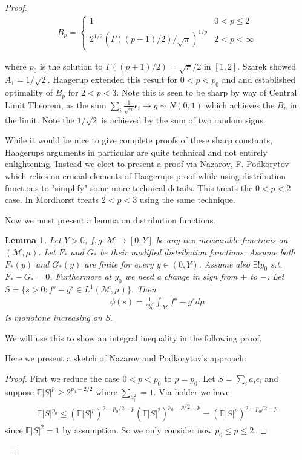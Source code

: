 \documentclass[10pt]{article}
\newcommand{\E}{\mathbb{E}}
\newcommand{\1}{\textbf{1}}
\newtheorem{lemma}[theorem]{Lemma}
\theoremstyle{remark}
\theoremstyle{definition}
\begin{document}
\begin{proof}
\begin{align*}
	B_p = 
	\begin{cases}
		1 & 0 < p \leq 2\\
		2^{1/2}(\Gamma((p+1)/2)/\sqrt{\pi})^{1/p} & 2 < p < \infty
	\end{cases}
\end{align*}

where $p_0$ is the solution to $\Gamma((p+1)/2) = \sqrt{\pi}/2$ in $[1,2]$. Szarek \cite{S} showed $A_1 = 1/\sqrt{2}$. Haagerup extended this result for $0 < p < p_0$ and and established optimality of $B_p$ for $2 < p <3$. Note this is seen to be sharp by way of Central Limit Theorem, as the sum $\sum_i \frac{1}{\sqrt{n}}\epsilon_i \to g \sim N(0,1)$ which achieves the $B_p$ in the limit. Note the $1/\sqrt{2}$ is achieved by the sum of two random signs.

While it would be nice to give complete proofs of these sharp constants, Haagerups arguments in particular are quite technical and not entirely enlightening. Instead we elect to present a proof via Nazarov, F. Podkorytov \cite{NP} which relies on crucial elements of Haagerups proof while using distribution functions to "simplify" some more technical details. This treats the $0 < p <2$ case. In \cite{M} Mordhorst treats $2 < p < 3$ using the same technique.

Now we must present a lemma on distribution functions.

\begin{lemma}
	Let $Y > 0$, $f,g : \mathcal{M} \to [0,Y]$ be any two measurable functions on $(\mathcal{M},\mu)$. Let $F_*$ and $G_*$ be their modified distribution functions. Assume both $F_*(y)$ and $G_*(y)$ are finite for every $y \in (0,Y)$. Assume also $\exists ! y_0$ s.t. $F_*-G_* = 0$. Furthermore at $y_0$ we need a change in sign from $+$ to $-$. Let $S = \{s > 0: f^s - g^s \in L^1(\mathcal{M},\mu)\}$. Then
	\begin{align*}
		\phi(s) = \frac{1}{sy_0^s}\int_{\mathcal{M}}f^s - g^s d\mu
	\end{align*}
	is monotone increasing on S. 
\end{lemma}


We will use this to show an integral inequality in the following proof.

Here we present a sketch of Nazarov and Podkorytov's approach:

\begin{proof}
	First we reduce the case $0 < p < p_0$ to $p = p_0$. Let $S = \sum_i a_i \epsilon_i$ and suppose $\E|S|^p \geq 2^{p_0 - 2/2}$ where $\sum_ a_i^2 = 1$. Via holder we have
	\begin{align*}
		\E|S|^{p_0} \leq (\E|S|^p)^{2-p_0/2-p}(\E|S|^2)^{p_0-p/2-p} = (\E|S|^p)^{2-p_0/2-p}
	\end{align*} 
	since $\E|S|^2 = 1$ by assumption. So we only consider now $p_0 \leq p \leq 2$. 


\end{proof}
\end{proof}
\end{document}
